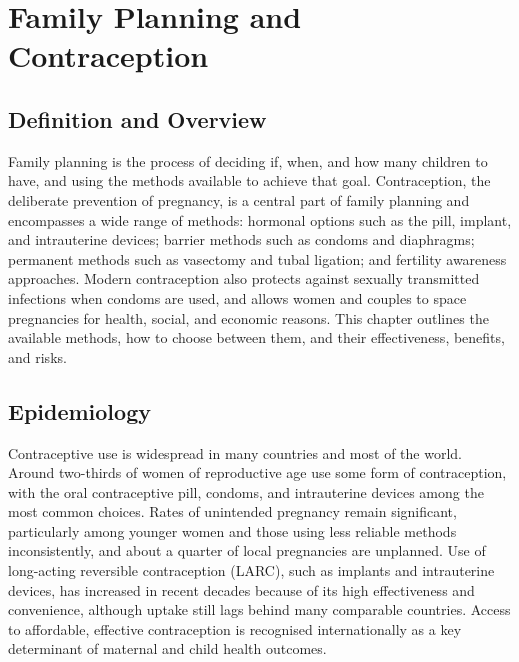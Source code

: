 \chapter{Family Planning and Contraception}

\section*{Definition and Overview}
Family planning is the process of deciding if, when, and how many children to have, and using the methods available to achieve that goal. Contraception, the deliberate prevention of pregnancy, is a central part of family planning and encompasses a wide range of methods: hormonal options such as the pill, implant, and intrauterine devices; barrier methods such as condoms and diaphragms; permanent methods such as vasectomy and tubal ligation; and fertility awareness approaches. Modern contraception also protects against sexually transmitted infections when condoms are used, and allows women and couples to space pregnancies for health, social, and economic reasons. This chapter outlines the available methods, how to choose between them, and their effectiveness, benefits, and risks.

\section*{Epidemiology}
Contraceptive use is widespread in many countries and most of the world. Around two-thirds of women of reproductive age use some form of contraception, with the oral contraceptive pill, condoms, and intrauterine devices among the most common choices. Rates of unintended pregnancy remain significant, particularly among younger women and those using less reliable methods inconsistently, and about a quarter of local pregnancies are unplanned. Use of long-acting reversible contraception (LARC), such as implants and intrauterine devices, has increased in recent decades because of its high effectiveness and convenience, although uptake still lags behind many comparable countries. Access to affordable, effective contraception is recognised internationally as a key determinant of maternal and child health outcomes.

